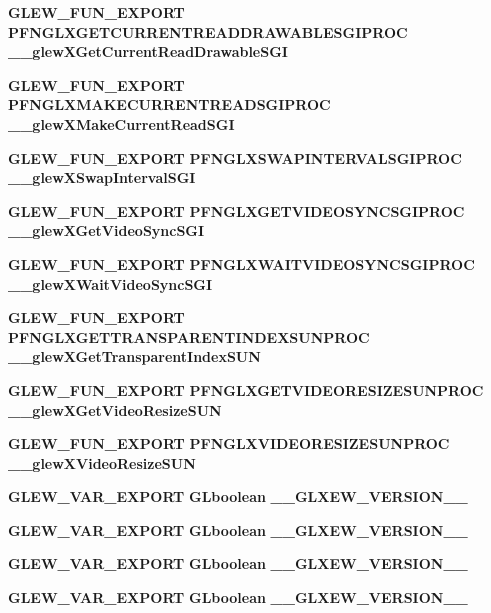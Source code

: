 \begin{DoxyCompactItemize}
\item 
{\bf G\+L\+E\+W\+\_\+\+F\+U\+N\+\_\+\+E\+X\+P\+O\+RT} {\bf P\+F\+N\+G\+L\+X\+G\+E\+T\+C\+U\+R\+R\+E\+N\+T\+R\+E\+A\+D\+D\+R\+A\+W\+A\+B\+L\+E\+S\+G\+I\+P\+R\+OC} {\bf \+\_\+\+\_\+glew\+X\+Get\+Current\+Read\+Drawable\+S\+GI}
\item 
{\bf G\+L\+E\+W\+\_\+\+F\+U\+N\+\_\+\+E\+X\+P\+O\+RT} {\bf P\+F\+N\+G\+L\+X\+M\+A\+K\+E\+C\+U\+R\+R\+E\+N\+T\+R\+E\+A\+D\+S\+G\+I\+P\+R\+OC} {\bf \+\_\+\+\_\+glew\+X\+Make\+Current\+Read\+S\+GI}
\item 
{\bf G\+L\+E\+W\+\_\+\+F\+U\+N\+\_\+\+E\+X\+P\+O\+RT} {\bf P\+F\+N\+G\+L\+X\+S\+W\+A\+P\+I\+N\+T\+E\+R\+V\+A\+L\+S\+G\+I\+P\+R\+OC} {\bf \+\_\+\+\_\+glew\+X\+Swap\+Interval\+S\+GI}
\item 
{\bf G\+L\+E\+W\+\_\+\+F\+U\+N\+\_\+\+E\+X\+P\+O\+RT} {\bf P\+F\+N\+G\+L\+X\+G\+E\+T\+V\+I\+D\+E\+O\+S\+Y\+N\+C\+S\+G\+I\+P\+R\+OC} {\bf \+\_\+\+\_\+glew\+X\+Get\+Video\+Sync\+S\+GI}
\item 
{\bf G\+L\+E\+W\+\_\+\+F\+U\+N\+\_\+\+E\+X\+P\+O\+RT} {\bf P\+F\+N\+G\+L\+X\+W\+A\+I\+T\+V\+I\+D\+E\+O\+S\+Y\+N\+C\+S\+G\+I\+P\+R\+OC} {\bf \+\_\+\+\_\+glew\+X\+Wait\+Video\+Sync\+S\+GI}
\item 
{\bf G\+L\+E\+W\+\_\+\+F\+U\+N\+\_\+\+E\+X\+P\+O\+RT} {\bf P\+F\+N\+G\+L\+X\+G\+E\+T\+T\+R\+A\+N\+S\+P\+A\+R\+E\+N\+T\+I\+N\+D\+E\+X\+S\+U\+N\+P\+R\+OC} {\bf \+\_\+\+\_\+glew\+X\+Get\+Transparent\+Index\+S\+UN}
\item 
{\bf G\+L\+E\+W\+\_\+\+F\+U\+N\+\_\+\+E\+X\+P\+O\+RT} {\bf P\+F\+N\+G\+L\+X\+G\+E\+T\+V\+I\+D\+E\+O\+R\+E\+S\+I\+Z\+E\+S\+U\+N\+P\+R\+OC} {\bf \+\_\+\+\_\+glew\+X\+Get\+Video\+Resize\+S\+UN}
\item 
{\bf G\+L\+E\+W\+\_\+\+F\+U\+N\+\_\+\+E\+X\+P\+O\+RT} {\bf P\+F\+N\+G\+L\+X\+V\+I\+D\+E\+O\+R\+E\+S\+I\+Z\+E\+S\+U\+N\+P\+R\+OC} {\bf \+\_\+\+\_\+glew\+X\+Video\+Resize\+S\+UN}
\item 
{\bf G\+L\+E\+W\+\_\+\+V\+A\+R\+\_\+\+E\+X\+P\+O\+RT} {\bf G\+Lboolean} {\bf \+\_\+\+\_\+\+G\+L\+X\+E\+W\+\_\+\+V\+E\+R\+S\+I\+O\+N\+\_\+\_}
\item 
{\bf G\+L\+E\+W\+\_\+\+V\+A\+R\+\_\+\+E\+X\+P\+O\+RT} {\bf G\+Lboolean} {\bf \+\_\+\+\_\+\+G\+L\+X\+E\+W\+\_\+\+V\+E\+R\+S\+I\+O\+N\+\_\+\_}
\item 
{\bf G\+L\+E\+W\+\_\+\+V\+A\+R\+\_\+\+E\+X\+P\+O\+RT} {\bf G\+Lboolean} {\bf \+\_\+\+\_\+\+G\+L\+X\+E\+W\+\_\+\+V\+E\+R\+S\+I\+O\+N\+\_\+\_}
\item 
{\bf G\+L\+E\+W\+\_\+\+V\+A\+R\+\_\+\+E\+X\+P\+O\+RT} {\bf G\+Lboolean} {\bf \+\_\+\+\_\+\+G\+L\+X\+E\+W\+\_\+\+V\+E\+R\+S\+I\+O\+N\+\_\+\_}

\end{DoxyCompactItemize}
